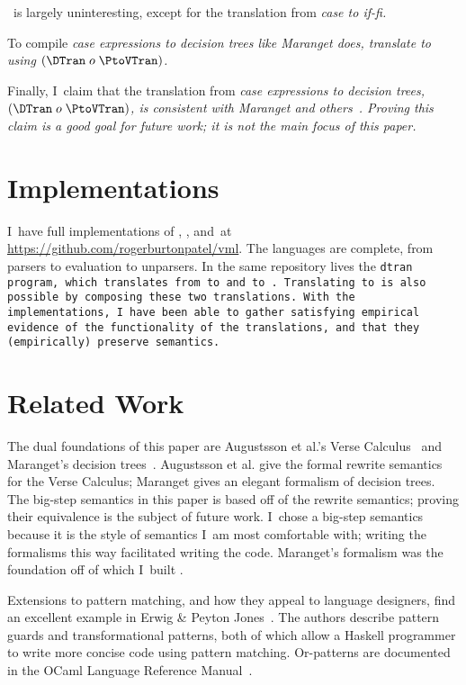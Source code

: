 \documentclass[manuscript,screen,review, 12pt, nonacm]{acmart}
\begin{document}
    \PtoVTran\ is largely uninteresting, except for the translation from
    \it{case} to \it{if-fi}.
        
    To compile \it{case} expressions to decision trees like Maranget does,
    translate \PPlus to \D using $(\DTran\; o\; \PtoVTran)$.
    
    Finally, I~claim that the translation from \it{case} expressions to decision
    trees, $(\DTran\; o\; \PtoVTran)$, is consistent with Maranget and
    others~\citep{maranget,scottramsey}. Proving this claim is a good goal for
    future work; it is not the main focus of this paper. 

    \section{Implementations}

    I~have full implementations of \PPlus, \VMinus, and~\D at
    \url{https://github.com/rogerburtonpatel/vml}. The languages are complete,
    from parsers to evaluation to unparsers. In the same repository lives the
    \tt{dtran} program, which translates from \PPlus to \VMinus and \VMinus to
    \D. Translating \PPlus to \D is also possible by composing these two
    translations. With the implementations, I~have been able to gather
    satisfying empirical evidence of the functionality of the translations, and
    that they (empirically) preserve semantics. 


    \section{Related Work}

    The dual foundations of this paper are Augustsson et al.'s Verse
    Calculus~\citep{verse} and Maranget's decision trees~\citep{maranget}.
    Augustsson et al. give the formal rewrite semantics for the Verse Calculus;
    Maranget gives an elegant formalism of decision trees. The big-step
    semantics in this paper is based off of the rewrite semantics; proving their
    equivalence is the subject of future work. I~chose a big-step semantics
    because it is the style of semantics I~am most comfortable with; writing the
    formalisms this way facilitated writing the code. Maranget's formalism was
    the foundation off of which I~built \D. 
    
    Extensions to pattern matching, and how they appeal to language designers,
    find an excellent example in Erwig \& Peyton Jones~\citep{guardproposal}.
    The authors describe pattern guards and transformational patterns, both of
    which allow a Haskell programmer to write more concise code using pattern
    matching. Or-patterns are documented in the OCaml Language Reference
    Manual~\citep{ocaml}.
    
\end{document}
